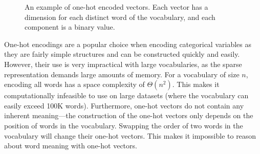 \documentclass{paper}
\newcommand\Tstrut{\rule{0pt}{2.6ex}}         %
\newcommand\Bstrut{\rule[-0.9ex]{0pt}{0pt}}   %
\begin{document}
\begin{figure}[t]
    \centering
    \caption{An example of one-hot encoded vectors. Each vector has a dimension for each distinct word of the vocabulary, and each component is a binary value.}
    \label{fig:one_hot_encoding}
\end{figure}

One-hot encodings are a popular choice when encoding categorical variables as they are fairly simple structures and can be constructed quickly and easily. However, their use is very impractical with large vocabularies, as the sparse representation demands large amounts of memory. For a vocabulary of size $n$, encoding all words has a space complexity of $\Theta(n^2)$. This makes it computationally infeasible to use on large datasets (where the vocabulary can easily exceed 100K words). Furthermore, one-hot vectors do not contain any inherent meaning---the construction of the one-hot vectors only depends on the position of words in the vocabulary. Swapping the order of two words in the vocabulary will change their one-hot vectors. This makes it impossible to reason about word meaning with one-hot vectors.
\end{document}
